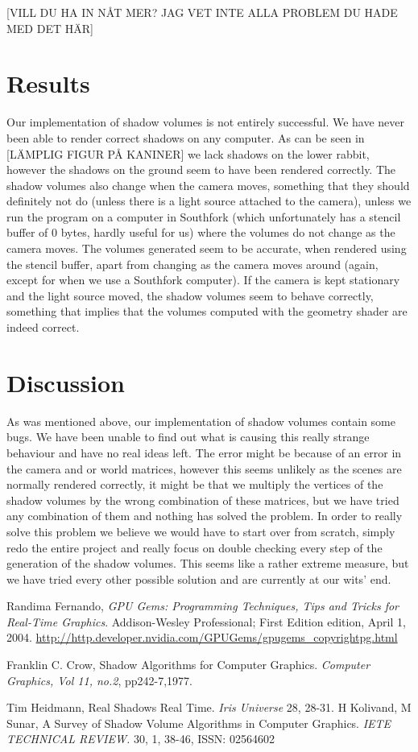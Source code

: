 \documentclass[a4paper, 12pt]{article}
\begin{document}
[VILL DU HA IN NÅT MER? JAG VET INTE ALLA PROBLEM DU HADE MED DET HÄR]

\section{Results}
Our implementation of shadow volumes is not entirely successful. We have never
been able to render correct shadows on any computer. As can be seen in [LÄMPLIG
FIGUR PÅ KANINER] we lack shadows on the lower rabbit, however the shadows on
the ground seem to have been rendered correctly. The shadow volumes also change
when the camera moves, something that they should definitely not do (unless
there is a light source attached to the camera), unless we run the program on
a computer in Southfork (which unfortunately has a stencil buffer of 0 bytes,
hardly useful for us) where the volumes do not change as the camera moves. The
volumes generated seem to be accurate, when rendered using the stencil buffer,
apart from changing as the camera moves around (again, except for when we use a
Southfork computer). If the camera is kept stationary and the light source
moved, the shadow volumes seem to behave correctly, something that implies that
the volumes computed with the geometry shader are indeed correct.

\section{Discussion}
As was mentioned above, our implementation of shadow volumes contain some bugs. We have been unable to find out what is causing this really strange behaviour and have no real ideas left. The error might be because of an error in the camera and or world matrices, however this seems unlikely as the scenes are normally rendered correctly, it might be that we multiply the vertices of the shadow volumes by the wrong combination of these matrices, but we have tried any combination of them and nothing has solved the problem. In order to really solve this problem we believe we would have to start over from scratch, simply redo the entire project and really focus on double checking every step of the generation of the shadow volumes. This seems like a rather extreme measure, but
we have tried every other possible solution and are currently at our wits' end.

\begin{thebibliography}{9}
	Randima Fernando,
	\emph{GPU Gems: Programming Techniques, Tips and Tricks for Real-Time
	Graphics}.
	Addison-Wesley Professional; First Edition edition, April 1, 2004.
	\url{http://http.developer.nvidia.com/GPUGems/gpugems\_copyrightpg.html}

  Franklin C. Crow,
  Shadow Algorithms for Computer Graphics.
  \emph{Computer Graphics, Vol 11, no.2}, pp242-7,1977.

  Tim Heidmann,
  Real Shadows Real Time.
  \emph{Iris Universe} 28, 28-31.
   H Kolivand, M Sunar,
   A Survey of Shadow Volume Algorithms in Computer Graphics.
   \emph{IETE TECHNICAL REVIEW.} 30, 1, 38-46, ISSN: 02564602
\end{thebibliography}
\end{document}
